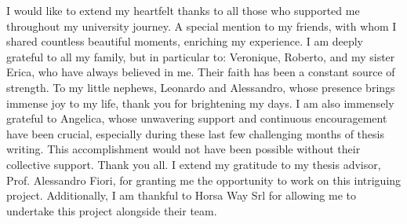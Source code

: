\documentclass[%
	corpo=11pt,
    twoside,
    stile=classica,
    oldstyle,
    tipotesi=custom,
    greek,
    evenboxes,
]{toptesi}
\begin{document}
\ringraziamenti%
I would like to extend my heartfelt thanks to all those who supported me throughout my university journey. A special mention to my friends, with whom I shared countless beautiful moments, enriching my experience.
\newline\newline
I am deeply grateful to all my family, but in particular to: Veronique, Roberto, and my sister Erica, who have always believed in me. Their faith has been a constant source of strength. To my little nephews, Leonardo and Alessandro, whose presence brings immense joy to my life, thank you for brightening my days.
\newline\newline
I am also immensely grateful to Angelica, whose unwavering support and continuous encouragement have been crucial, especially during these last few challenging months of thesis writing.
\newline\newline
This accomplishment would not have been possible without their collective support. Thank you all.
\newline\newline
I extend my gratitude to my thesis advisor, Prof. Alessandro Fiori, for granting me the opportunity to work on this intriguing project. Additionally, I am thankful to Horsa Way Srl for allowing me to undertake this project alongside their team.


\tablespagetrue\figurespagetrue%

\indici%


%    


\mainmatter












\end{document}
